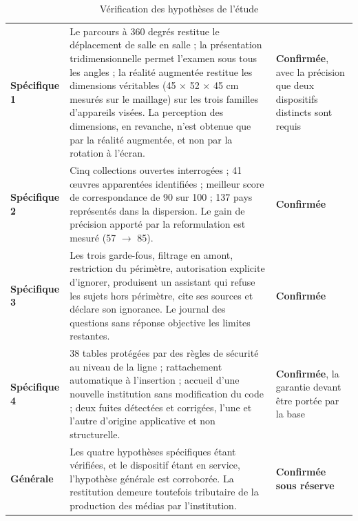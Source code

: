 \begin{table}[htbp]
\centering
\caption{Vérification des hypothèses de l'étude}
\label{tab:hypotheses}
\footnotesize
\begin{tabularx}{\textwidth}{|C{2.1cm}|X|C{2.6cm}|}
\hline
{}
 &  &  \\ \hline
\textbf{Spécifique 1} &
Le parcours à 360 degrés restitue le déplacement de salle en salle ; la
présentation tridimensionnelle permet l'examen sous tous les angles ; la réalité
augmentée restitue les dimensions véritables (45 $\times$ 52 $\times$ 45 cm
mesurés sur le maillage) sur les trois familles d'appareils visées. La
perception des dimensions, en revanche, n'est obtenue que par la réalité
augmentée, et non par la rotation à l'écran. &
\textbf{Confirmée}, avec la précision que deux dispositifs distincts sont
requis \\ \hline
\textbf{Spécifique 2} &
Cinq collections ouvertes interrogées ; 41 œuvres apparentées identifiées ;
meilleur score de correspondance de 90 sur 100 ; 137 pays représentés dans la
dispersion. Le gain de précision apporté par la reformulation est mesuré
(57 $\rightarrow$ 85). &
\textbf{Confirmée} \\ \hline
\textbf{Spécifique 3} &
Les trois garde-fous, filtrage en amont, restriction du périmètre, autorisation
explicite d'ignorer, produisent un assistant qui refuse les sujets hors
périmètre, cite ses sources et déclare son ignorance. Le journal des questions
sans réponse objective les limites restantes. &
\textbf{Confirmée} \\ \hline
\textbf{Spécifique 4} &
38 tables protégées par des règles de sécurité au niveau de la ligne ;
rattachement automatique à l'insertion ; accueil d'une nouvelle institution sans
modification du code ; deux fuites détectées et corrigées, l'une et l'autre
d'origine applicative et non structurelle. &
\textbf{Confirmée}, la garantie devant être portée par la base \\ \hline
\textbf{Générale} &
Les quatre hypothèses spécifiques étant vérifiées, et le dispositif étant en
service, l'hypothèse générale est corroborée. La restitution demeure toutefois
tributaire de la production des médias par l'institution. &
\textbf{Confirmée sous réserve} \\ \hline
\end{tabularx}
\end{table}

